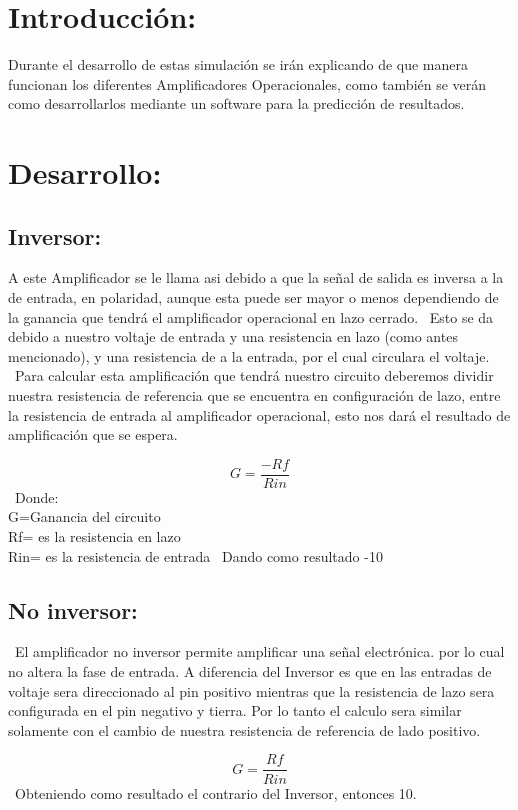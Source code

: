 \documentclass[14pt,letterpaper]{article}
\begin{document}
\newpage
\section{Introducción:}
Durante el desarrollo de estas simulación se irán explicando de que manera funcionan los diferentes Amplificadores Operacionales, como también se verán como desarrollarlos mediante un software para la predicción de resultados.

\section{Desarrollo:}
\subsection{Inversor:}
A este Amplificador se le llama asi debido a que la señal de salida es inversa a la de entrada, en polaridad, aunque esta puede ser mayor o menos dependiendo de la ganancia que tendrá el amplificador operacional en lazo cerrado.
\
Esto se da debido a nuestro voltaje de entrada y una resistencia en lazo (como antes mencionado), y una resistencia de a la entrada, por el cual circulara el voltaje.
\
Para calcular esta amplificación que tendrá nuestro circuito deberemos dividir nuestra resistencia de referencia que se encuentra en configuración de lazo, entre la resistencia de entrada al amplificador operacional, esto nos dará el resultado de amplificación que se espera.

$$G=\frac{-Rf}{Rin}$$
\
Donde:\\ G=Ganancia del circuito\\Rf= es la resistencia en lazo\\ Rin= es la resistencia de entrada
\
Dando como resultado -10

\subsection{No inversor:}
\
El amplificador no inversor permite amplificar una señal electrónica. por lo cual no altera la fase de entrada. A diferencia del Inversor es que en las entradas de voltaje sera direccionado al pin positivo mientras que la resistencia de lazo sera configurada en el pin negativo y tierra. Por lo tanto el calculo sera similar solamente con el cambio de nuestra resistencia de referencia de lado positivo.

$$G=\frac{Rf}{Rin}$$
\
Obteniendo como resultado el contrario del Inversor, entonces 10.
\
\end{document}
